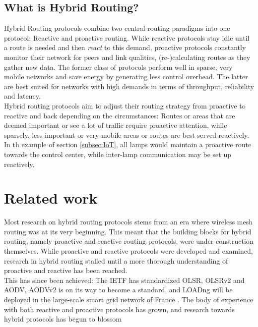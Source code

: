 \documentclass[a4paper,10pt]{scrartcl}
\begin{document}
\subsection{What is Hybrid Routing?}
\label{subsec:hybrid}
Hybrid Routing protocols combine two central routing paradigms into one protocol: Reactive and proactive routing. While reactive protocols stay idle until a route is needed and then \emph{react} to this demand, proactive protocols constantly monitor their network for peers and link qualities, (re-)calculating routes as they gather new data. The former class of protocols perform well in sparse, very mobile networks and save energy by generating less control overhead. The latter are best suited for networks with high demands in terms of throughput, reliability and latency.\\
Hybrid routing protocols aim to adjust their routing strategy from proactive to reactive and back depending on the circumstances: Routes or areas that are deemed important or see a lot of traffic require proactive attention, while sparsely, less important or very mobile areas or routes are best served reactively.\\
In th example of section \ref{subsec:IoT}, all lamps would maintain a proactive route towards the control center, while inter-lamp communication may be set up reactively.

\section{Related work}
\label{sec:related_work}

Most research on hybrid routing protocols stems from an era where wireless mesh routing was at its very beginning. This meant that the building blocks for hybrid routing, namely proactive and reactive routing protocols, were under construction themselves. While proactive and reactive protocols were developed and examined, research in hybrid routing stalled until a more thorough understanding of proactive and reactive has been reached.\\
This has since been achieved: The \gls{IETF} has standardized \gls{OLSR}, OLSRv2  and \gls{AODV}, AODVv2 is on its way to become a standard, and \gls{LOADng} will be deployed in the large-scale smart grid network of France \cite{X800}. The body of experience with both reactive and proactive protocols has grown, and research towards hybrid protocols has begun to blossom \cite{baccelli_p2p_rpl} \cite{HYMAD}\\
\end{document}
